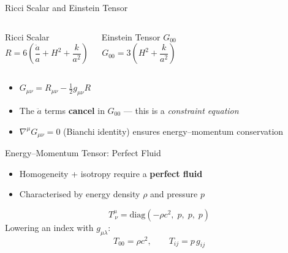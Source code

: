\documentclass[aspectratio=169,11pt]{beamer}
\begin{document}
\begin{frame}{Ricci Scalar and Einstein Tensor}
\begin{columns}[T]
\begin{block}{Ricci Scalar}
\begin{equation*}
    R = 6\!\left(\frac{\ddot{a}}{a} + H^2 + \frac{k}{a^2}\right)
\end{equation*}
\end{block}

\begin{block}{Einstein Tensor $G_{00}$}
\begin{equation*}
    G_{00} = 3\!\left(H^2+\frac{k}{a^2}\right)
\end{equation*}
\end{block}
\end{columns}

\vspace{0.5cm}
\begin{itemize}
    \item $G_{\mu\nu}=R_{\mu\nu}-\frac{1}{2}g_{\mu\nu}R$
    \item The $\ddot{a}$ terms \textbf{cancel} in $G_{00}$ --- this is a \emph{constraint equation}
    \item $\nabla^\mu G_{\mu\nu}=0$ (Bianchi identity) ensures energy--momentum conservation
\end{itemize}
\end{frame}

\begin{frame}{Energy--Momentum Tensor: Perfect Fluid}
\begin{itemize}
    \item Homogeneity + isotropy require a \textbf{perfect fluid}
    \item Characterised by energy density $\rho$ and pressure $p$
\end{itemize}
\begin{equation*}
    T^\mu_{\ \nu}
    = \mathrm{diag}(-\rho c^2,\; p,\; p,\; p)
\end{equation*}
Lowering an index with $g_{\mu\lambda}$:
\begin{equation*}
    T_{00} = \rho c^2, \qquad T_{ij} = p\,g_{ij}
\end{equation*}
\end{frame}
\end{document}
